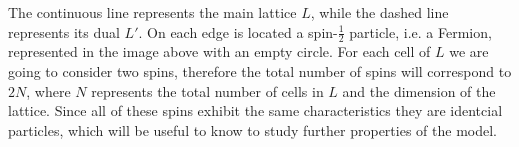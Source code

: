 \documentclass[12pt]{report}
\begin{document}
\begin{minipage}{1\textwidth}
\begin{center}
		
	    \end{center}
	    
	    The continuous line represents the main lattice $L$, while the dashed line represents its dual $L'$.\newline 
		On each edge is located a spin-$\frac{1}{2}$ particle, i.e. a Fermion, represented in the image above with an empty circle.
		For each cell of $L$ we are going to consider two spins, therefore the total number of spins will correspond to $2N$, where $N$ represents the total number of cells in $L$ and the dimension of the lattice. \newline
		Since all of these spins exhibit the same characteristics they are identcial particles, which will be useful to know to study further properties of the model.
	
	\end{minipage}
	
\end{document}
